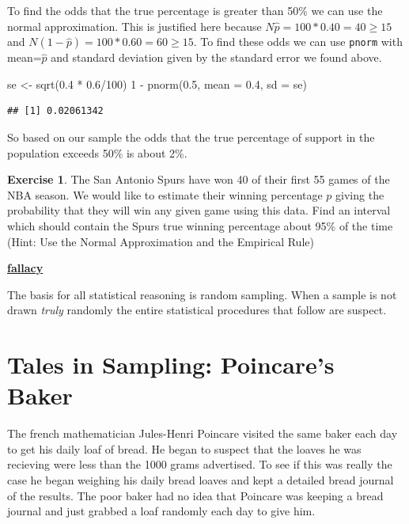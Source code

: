 \documentclass[
]{book}
\newenvironment{Shaded}{\begin{snugshade}}{\end{snugshade}}
\newcommand{\AttributeTok}[1]{\textcolor[rgb]{0.77,0.63,0.00}{#1}}
\newcommand{\DecValTok}[1]{\textcolor[rgb]{0.00,0.00,0.81}{#1}}
\newcommand{\FloatTok}[1]{\textcolor[rgb]{0.00,0.00,0.81}{#1}}
\newcommand{\FunctionTok}[1]{\textcolor[rgb]{0.00,0.00,0.00}{#1}}
\newcommand{\NormalTok}[1]{#1}
\newcommand{\OtherTok}[1]{\textcolor[rgb]{0.56,0.35,0.01}{#1}}
\newcommand{\SpecialCharTok}[1]{\textcolor[rgb]{0.00,0.00,0.00}{#1}}
\newenvironment{rmdblock}[1]
  {\begin{shaded*}
  \centerline{\underline{\textbf{#1}}}

  }
  {
  \end{shaded*}
  }
\newenvironment{fallacy}
  {\begin{rmdblock}{fallacy}}
  {\end{rmdblock}}
\theoremstyle{definition}
\theoremstyle{definition}
\theoremstyle{definition}
\newtheorem{exercise}{Exercise}[chapter]
\theoremstyle{definition}
\theoremstyle{remark}
\begin{document}
To find the odds that the true percentage is greater than 50\% we can use the normal approximation. This is justified here because \(N\hat{p}=100*0.40=40\geq 15\) and \(N(1-\hat{p})=100*0.60=60 \geq 15\). To find these odds we can use \texttt{pnorm} with mean=\(\hat{p}\) and standard deviation given by the standard error we found above.

\begin{Shaded}
\begin{Highlighting}[]
\NormalTok{se }\OtherTok{\textless{}{-}} \FunctionTok{sqrt}\NormalTok{(}\FloatTok{0.4} \SpecialCharTok{*} \FloatTok{0.6}\SpecialCharTok{/}\DecValTok{100}\NormalTok{)}
\DecValTok{1} \SpecialCharTok{{-}} \FunctionTok{pnorm}\NormalTok{(}\FloatTok{0.5}\NormalTok{, }\AttributeTok{mean =} \FloatTok{0.4}\NormalTok{, }\AttributeTok{sd =}\NormalTok{ se)}
\end{Highlighting}
\end{Shaded}

\begin{verbatim}
## [1] 0.02061342
\end{verbatim}

So based on our sample the odds that the true percentage of support in the population exceeds 50\% is about 2\%.

\begin{exercise}
\protect\hypertarget{exr:unnamed-chunk-353}{}\label{exr:unnamed-chunk-353}The San Antonio Spurs have won 40 of their first 55 games of the NBA season. We would like to estimate their winning percentage \(p\) giving the probability that they will win any given game using this data. Find an interval which should contain the Spurs true winning percentage about 95\% of the time (Hint: Use the Normal Approximation and the Empirical Rule)
\end{exercise}

\begin{fallacy}
The basis for all statistical reasoning is random sampling. When a sample is not drawn \emph{truly} randomly the entire statistical procedures that follow are suspect.
\end{fallacy}

\hypertarget{tales-in-sampling-poincares-baker}{%
\section{Tales in Sampling: Poincare's Baker}\label{tales-in-sampling-poincares-baker}}

The french mathematician Jules-Henri Poincare visited the same baker each day to get his daily loaf of bread. He began to suspect that the loaves he was recieving were less than the 1000 grams advertised. To see if this was really the case he began weighing his daily bread loaves and kept a detailed bread journal of the results. The poor baker had no idea that Poincare was keeping a bread journal and just grabbed a loaf randomly each day to give him.
\end{document}
